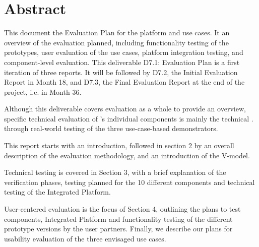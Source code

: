 \section*{Abstract}


This document  the Evaluation Plan 
for the \SUMMA platform and  use cases. 
It  an overview of the evaluation planned, including functionality testing of the prototypes, user evaluation of the use cases, 
platform integration testing, and component-level evaluation. This deliverable D7.1: Evaluation Plan is a first iteration of three reports. It will be followed by D7.2, the Initial Evaluation Report in Month 18, and D7.3, the Final Evaluation Report at the end of the project, i.e. in Month 36.



Although this deliverable covers \SUMMA evaluation as a whole to provide an overview, specific technical evaluation of \SUMMA's individual components is 
 mainly  the 
technical . 
 through real-world testing of the three use-case-based demonstrators.


This report starts with an introduction, followed in section 2 by an overall description of the evaluation methodology, and an introduction of the V-model.

Technical testing is covered in Section 3, with a brief explanation of the verification phases, testing planned for the 10 different \SUMMA components and technical testing of the Integrated Platform.

User-centered evaluation is the focus of Section 4, outlining the plans to test \SUMMA components, Integrated Platform and functionality testing of the different prototype versions by the user partners. Finally, we describe our plans for usability evaluation of the three envisaged use cases.

